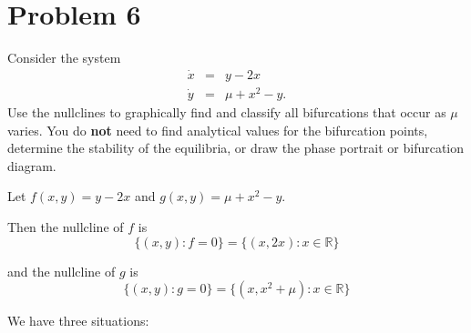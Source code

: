\documentclass[12pt]{article}
\newcommand{\R}{\mathbb{R}}
\begin{document}
\pagebreak
\section*{Problem 6}

Consider the system
\begin{eqnarray*}
    \dot{x} & = & y-2x \\
    \dot{y} & = & \mu+x^2-y.
\end{eqnarray*}
Use the nullclines to graphically find and classify all bifurcations that occur as $\mu$ varies. You do \textbf{not} need to find analytical values for the bifurcation points, determine the stability of the equilibria, or draw the phase portrait or bifurcation diagram.

\color{blue}
Let $f(x, y) = y - 2x$ and $g(x, y) = \mu + x^2 - y$.

Then the nullcline of $f$ is
\[\{(x, y): f = 0\} = \{(x, 2x): x \in \R\}\]

and the nullcline of $g$ is
\[\{(x, y): g = 0\} = \{(x, x^2 + \mu): x \in \R\}\]

We have three situations:
\end{document}
